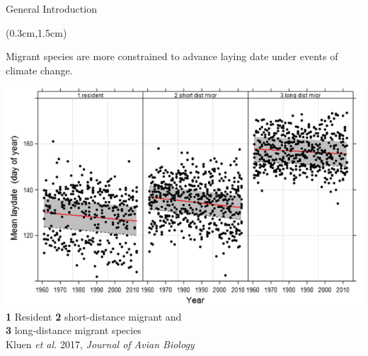 \documentclass[compress]{beamer}
\begin{document}
\begin{frame}{General Introduction}\vspace{10pt}

\begin{textblock*}{6cm}(0.3cm,1.5cm)

Migrant species are more constrained to advance laying date under events of climate change.
\vspace{0.2cm}

\includegraphics[height = 4 cm]{Image/migrant2.png} \\
 \scriptsize \textbf{1} Resident \textbf{2} short-distance migrant and \\ \textbf{3} long-distance migrant species\\
\raggedleft
\vspace{0.1cm}
  \tiny{Kluen \textit{et al.} 2017, \textit{Journal of Avian Biology}} \\

\end{textblock*}

\end{frame}
\end{document}
